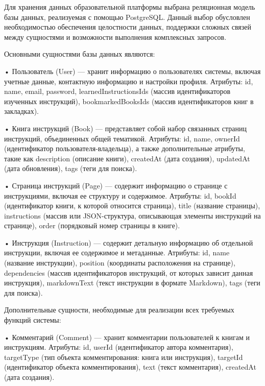 {\gostFont

  \par \redline Для хранения данных образовательной платформы выбрана реляционная модель базы данных, реализуемая с помощью PostgreSQL. Данный выбор обусловлен необходимостью обеспечения целостности данных, поддержки сложных связей между сущностями и возможности выполнения комплексных запросов.

  \par \redline Основными сущностями базы данных являются:

  \par \redline • Пользователь (User) — хранит информацию о пользователях системы, включая учетные данные, контактную информацию и настройки профиля. Атрибуты: id, name, email, password, learnedInstructionsIds (массив идентификаторов изученных инструкций), bookmarkedBooksIds (массив идентификаторов книг в закладках).
  
  \par \redline • Книга инструкций (Book) — представляет собой набор связанных страниц инструкций, объединенных общей тематикой. Атрибуты: id, name, ownerId (идентификатор пользователя-владельца), а также дополнительные атрибуты, такие как description (описание книги), createdAt (дата создания), updatedAt (дата обновления), tags (теги для поиска).
  
  \par \redline • Страница инструкций (Page) — содержит информацию о странице с инструкциями, включая ее структуру и содержимое. Атрибуты: id, bookId (идентификатор книги, к которой относится страница), title (название страницы), instructions (массив или JSON-структура, описывающая элементы инструкций на странице), order (порядковый номер страницы в книге).
  
  \par \redline • Инструкция (Instruction) — содержит детальную информацию об отдельной инструкции, включая ее содержимое и метаданные. Атрибуты: id, name (название инструкции), position (координаты расположения на странице), dependencies (массив идентификаторов инструкций, от которых зависит данная инструкция), markdownText (текст инструкции в формате Markdown), tags (теги для поиска).

  \par \redline Дополнительные сущности, необходимые для реализации всех требуемых функций системы:

  \par \redline • Комментарий (Comment) — хранит комментарии пользователей к книгам и инструкциям. Атрибуты: id, userId (идентификатор автора комментария), targetType (тип объекта комментирования: книга или инструкция), targetId (идентификатор объекта комментирования), text (текст комментария), createdAt (дата создания).
  
}
